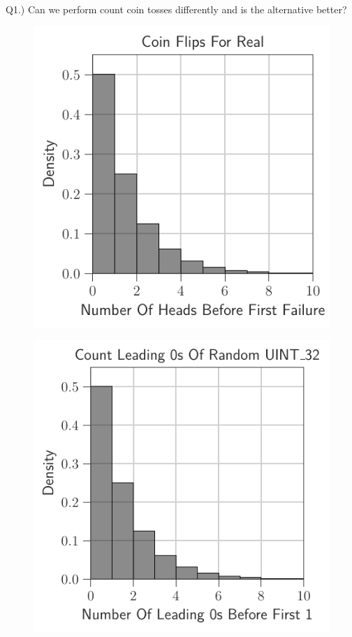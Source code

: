 \documentclass[12pt]{article}
\begin{document}
Q1.) Can we perform count coin tosses differently and is the alternative better?

\begin{figure}[H]
	\centering
	\begin{minipage}{0.32\textwidth}
		\centering
		\includegraphics[width=\linewidth]{../notebook/plot/coin_flips_for_real.pdf}
		\label{fig:coin_flips_for_real}
	\end{minipage}\hfill
	\begin{minipage}{0.32\textwidth}
		\centering
		\includegraphics[width=\linewidth]{../notebook/plot/count_leading_0s_of_random_uint_32.pdf}

\end{minipage}
\end{figure}
\end{document}
